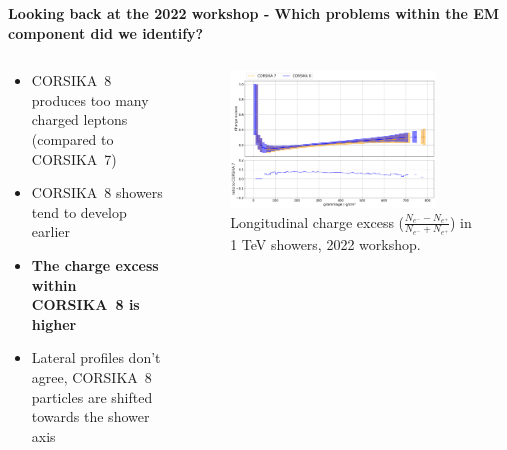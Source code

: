 \documentclass[aspectratio=1610, 9pt]{beamer}
\begin{document}
\begin{frame}

\textbf{Looking back at the 2022 workshop - Which problems within the EM component did we identify?}

    \begin{columns}[onlytextwidth]
        \begin{column}{0.5\textwidth}
            \begin{itemize}
              \item CORSIKA~8 produces too many charged leptons (compared to CORSIKA~7)
              \item CORSIKA~8 showers tend to develop earlier
              \item \textbf{The charge excess within CORSIKA~8 is higher}
              \item Lateral profiles don't agree, CORSIKA~8 particles are shifted towards the shower axis
            \end{itemize}
        \end{column}
        \begin{column}{0.5\textwidth}
            \begin{figure}
                \centering
                \includegraphics[width=0.85\textwidth]{plots/charge_excess_2022.png}
                \caption{Longitudinal charge excess ($\frac{N_{e^-} - N_{e^+}}{N_{e^-} + N_{e^+}}$) in 1 \si{\tera\electronvolt} showers, 2022 workshop.}
            \end{figure}
        \end{column}
    \end{columns}
\end{frame}
\end{document}
